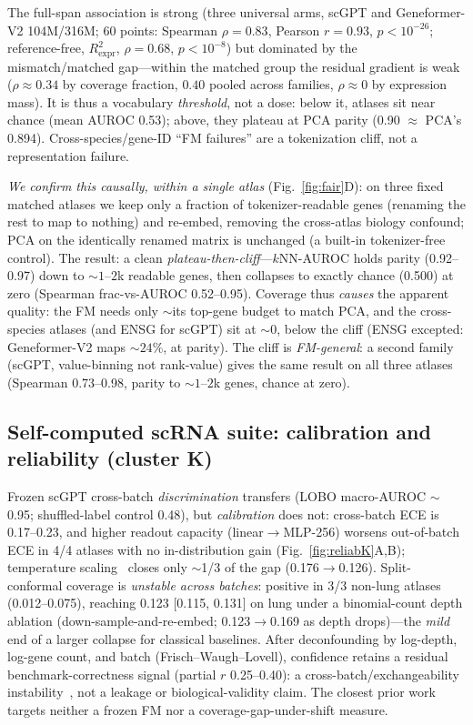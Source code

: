 \documentclass[journal]{IEEEtran}
\begin{document}
The full-span association is strong (three universal arms, scGPT and Geneformer-V2 104M/316M; 60 points: Spearman $\rho=0.83$, Pearson $r=0.93$, $p<10^{-26}$; reference-free, $R^2_{\mathrm{expr}}$, $\rho=0.68$, $p<10^{-8}$) but dominated by the mismatch/matched gap---within the matched group the residual gradient is weak ($\rho\approx0.34$ by coverage fraction, $0.40$ pooled across families, $\rho\!\approx\!0$ by expression mass). It is thus a vocabulary \emph{threshold}, not a dose: below it, atlases sit near chance (mean AUROC 0.53); above, they plateau at PCA parity (0.90 $\approx$ PCA's 0.894). Cross-species/gene-ID ``FM failures'' are a tokenization cliff, not a representation failure.

\emph{We confirm this causally, within a single atlas} (Fig.~\ref{fig:fair}D): on three fixed matched atlases we keep only a fraction of tokenizer-readable genes (renaming the rest to map to nothing) and re-embed, removing the cross-atlas biology confound; PCA on the identically renamed matrix is unchanged (a built-in tokenizer-free control). The result: a clean \emph{plateau-then-cliff}---$k$NN-AUROC holds parity (0.92--0.97) down to ${\sim}1$--$2$k readable genes, then collapses to exactly chance (0.500) at zero (Spearman frac-vs-AUROC 0.52--0.95). Coverage thus \emph{causes} the apparent quality: the FM needs only ${\sim}$its top-gene budget to match PCA, and the cross-species atlases (and ENSG for scGPT) sit at ${\sim}0$, below the cliff (ENSG excepted: Geneformer-V2 maps ${\sim}24\%$, at parity). The cliff is \emph{FM-general}: a second family (scGPT, value-binning not rank-value) gives the same result on all three atlases (Spearman 0.73--0.98, parity to ${\sim}1$--$2$k genes, chance at zero).

\subsection{Self-computed scRNA suite: calibration and reliability (cluster K)}
Frozen scGPT cross-batch \emph{discrimination} transfers (LOBO macro-AUROC $\sim$0.95; shuffled-label control 0.48), but \emph{calibration} does not: cross-batch ECE is 0.17--0.23, and higher readout capacity (linear$\to$MLP-256) worsens out-of-batch ECE in 4/4 atlases with no in-distribution gain (Fig.~\ref{fig:reliabK}A,B); temperature scaling~\cite{guo2017} closes only $\sim$1/3 of the gap (0.176$\to$0.126). Split-conformal coverage is \emph{unstable across batches}: positive in 3/3 non-lung atlases (0.012--0.075), reaching 0.123 [0.115, 0.131] on lung under a binomial-count depth ablation (down-sample-and-re-embed; 0.123$\to$0.169 as depth drops)---the \emph{mild} end of a larger collapse for classical baselines. After deconfounding by log-depth, log-gene count, and batch (Frisch--Waugh--Lovell), confidence retains a residual benchmark-correctness signal (partial $r$ 0.25--0.40): a cross-batch/exchangeability instability~\cite{barber2023}, not a leakage or biological-validity claim. The closest prior work~\cite{lopezdecastro2025} targets neither a frozen FM nor a coverage-gap-under-shift measure.
\end{document}
